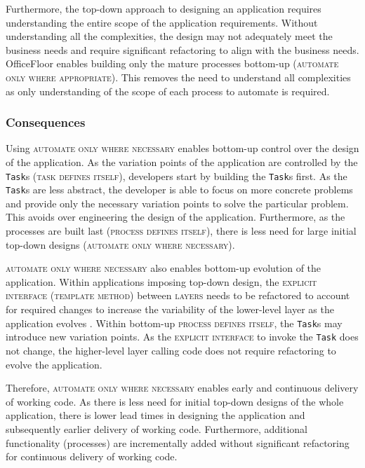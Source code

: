 \documentclass[prodmode]{style/acmlarge}
\begin{document}
Furthermore, the top-down approach to designing an application requires
understanding the entire scope of the application requirements.  Without
understanding all the complexities, the design may not adequately meet the
business needs and require significant refactoring to align with the business
needs.  OfficeFloor enables building only the mature processes bottom-up
(\textsc{automate only where appropriate}).  This removes the need to understand
all complexities as only understanding of the scope of each process to automate
is required.


\subsubsection*{Consequences}

Using \textsc{automate only where necessary} enables bottom-up control over the
design of the application.  As the variation points of the application are
controlled by the \texttt{Task}s (\textsc{task defines itself}), developers
start by building the \texttt{Task}s first.  As the \texttt{Task}s are less
abstract, the developer is able to focus on more concrete problems and provide
only the necessary variation points to solve the particular problem.  This
avoids over engineering the design of the application.  Furthermore, as the
processes are built last (\textsc{process defines itself}), there is less need
for large initial top-down designs (\textsc{automate only where necessary}).

\textsc{automate only where necessary} also enables bottom-up evolution of the
application.  Within applications imposing top-down design, the
\textsc{explicit interface} (\textsc{template method}) between \textsc{layers}
needs to be refactored to account for required changes to increase the
variability of the lower-level layer as the application evolves \cite{ioc}.
Within bottom-up \textsc{process defines itself}, the \texttt{Task}s may
introduce new variation points.  As the \textsc{explicit interface} to invoke
the \texttt{Task} does not change, the higher-level layer calling code does not
require refactoring to evolve the application.

Therefore, \textsc{automate only where necessary} enables early and continuous
delivery of working code.  As there is less need for initial top-down designs of
the whole application, there is lower lead times in designing the application
and subsequently earlier delivery of working code.  Furthermore, additional
functionality (processes) are incrementally added without significant
refactoring for continuous delivery of working code.
\end{document}
